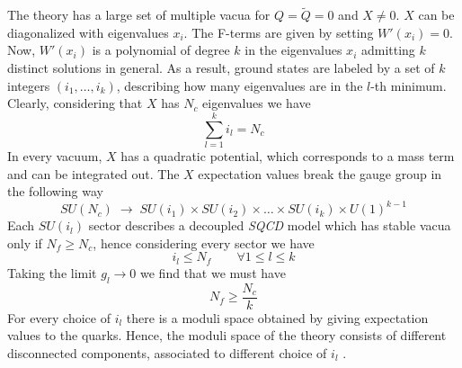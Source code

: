 The theory has a large set of multiple vacua for $Q=\tilde{Q} = 0$ and $X \neq 0 $. 
$X$ can be diagonalized with eigenvalues $x_i$.
The F-terms are given by setting $W'(x_i) = 0$. 
Now, $W'(x_i)$ is a polynomial of degree $k$ in the eigenvalues $x_i$ admitting $k$ distinct solutions in general. 
As a result, ground states are labeled by a set of $k$ integers $(i_1, \dotsc, i_k)$, describing how many eigenvalues are in the $l$-th minimum. Clearly, considering that $X$ has $N_c$ eigenvalues we have 
\begin{equation}
 \sum_{l=1}^k i_l = N_c
\end{equation}
In every vacuum, $X$ has a quadratic potential, which corresponds to a mass term and can be integrated out.
The $X$ expectation values break the gauge group in the following way
\begin{equation}
	SU(N_c) \; \longrightarrow \; SU(i_1) \times SU(i_2) \times \dots \times SU(i_k) \times U(1)^{k-1}
\end{equation}
Each $SU({i_l})$ sector describes a decoupled \emph{SQCD} model which has stable vacua only if $N_f \geq N_c$, hence considering every sector we have 
\begin{equation}
i_l \leq N_f \qquad \forall 1 \leq l \leq k
\end{equation}
Taking the limit $g_l \rightarrow 0$ we find that we must have
\begin{equation}
 N_f \geq \frac{N_c}{k}
 \label{eqn:kutasov_vacuum_condition}
\end{equation}
For every choice of ${i_l}$ there is a moduli space obtained by giving expectation values to the quarks.
Hence, the moduli space of the theory consists of different disconnected components, associated to different choice of ${i_l}$ .



